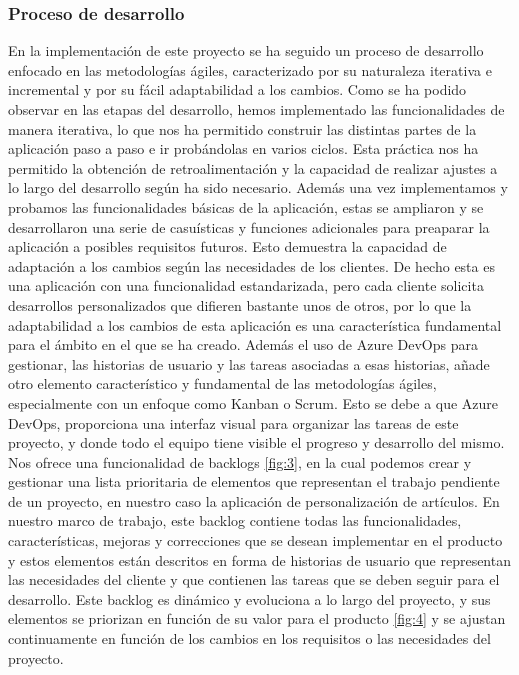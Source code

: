 \documentclass[12pt]{article}
\begin{document}
\subsubsection{Proceso de desarrollo}
En la implementación de este proyecto se ha seguido un proceso de desarrollo enfocado en las metodologías ágiles, caracterizado por su naturaleza iterativa e incremental y por su fácil adaptabilidad a los cambios. Como se ha podido observar en las etapas del desarrollo,
hemos implementado las funcionalidades de manera iterativa, lo que nos ha permitido construir las distintas partes de la aplicación paso a paso e ir probándolas en varios ciclos.
Esta práctica nos ha permitido la obtención de retroalimentación y la capacidad de realizar ajustes a lo largo del desarrollo según ha sido necesario.
Además una vez implementamos y probamos las funcionalidades básicas de la aplicación, estas se ampliaron y se desarrollaron una serie de casuísticas y funciones adicionales para preaparar la aplicación a posibles
requisitos futuros. Esto demuestra la capacidad de adaptación a los cambios según las necesidades de los clientes. De hecho esta es una aplicación con una funcionalidad estandarizada, pero 
cada cliente solicita desarrollos personalizados que difieren bastante unos de otros, por lo que la adaptabilidad a los cambios de esta aplicación es una característica fundamental para el ámbito en el que se ha creado.
Además el uso de Azure DevOps para gestionar, las historias de usuario y las tareas asociadas a esas historias, añade otro elemento característico y fundamental de las metodologías ágiles, especialmente con un enfoque como Kanban o Scrum.
Esto se debe a que Azure DevOps, proporciona una interfaz visual para organizar las tareas de este proyecto, y donde todo el equipo tiene visible el progreso y desarrollo del mismo.
Nos ofrece una funcionalidad de backlogs \ref{fig:3}, en la cual podemos crear y gestionar una lista prioritaria de elementos que representan el trabajo pendiente de un proyecto, en nuestro caso la aplicación de personalización de artículos. En nuestro marco de trabajo, este backlog contiene todas las funcionalidades, características, mejoras y correcciones que se desean implementar
en el producto y estos elementos están descritos en forma de historias de usuario que representan las necesidades del cliente y que contienen las tareas que se deben seguir para el desarrollo.
Este backlog es dinámico y evoluciona a lo largo del proyecto, y sus elementos se priorizan en función de su valor para el producto \ref{fig:4} y se ajustan continuamente en función de los cambios en los requisitos o las necesidades del proyecto.
\end{document}
